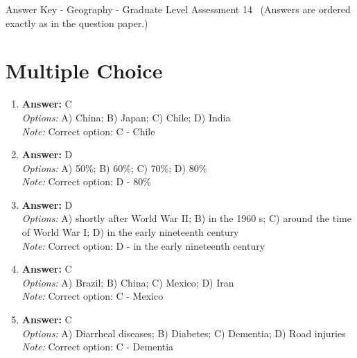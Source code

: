 \documentclass[12pt]{article}
\begin{document}
\begin{center}
Answer Key - Geography - Graduate Level Assessment 14 \
\small (Answers are ordered exactly as in the question paper.)
\end{center}

\section*{Multiple Choice}
\begin{enumerate}[label=\arabic*.]
\item \textbf{Answer:} C
\\ \textit{Options:} A) China; B) Japan; C) Chile; D) India
\\ \textit{Note:} Correct option: C - Chile
\item \textbf{Answer:} D
\\ \textit{Options:} A) 50\%; B) 60\%; C) 70\%; D) 80\%
\\ \textit{Note:} Correct option: D - 80\%
\item \textbf{Answer:} D
\\ \textit{Options:} A) shortly after World War II; B) in the 1960 s; C) around the time of World War I; D) in the early nineteenth century
\\ \textit{Note:} Correct option: D - in the early nineteenth century
\item \textbf{Answer:} C
\\ \textit{Options:} A) Brazil; B) China; C) Mexico; D) Iran
\\ \textit{Note:} Correct option: C - Mexico
\item \textbf{Answer:} C
\\ \textit{Options:} A) Diarrheal diseases; B) Diabetes; C) Dementia; D) Road injuries
\\ \textit{Note:} Correct option: C - Dementia
\end{enumerate}
\end{document}
